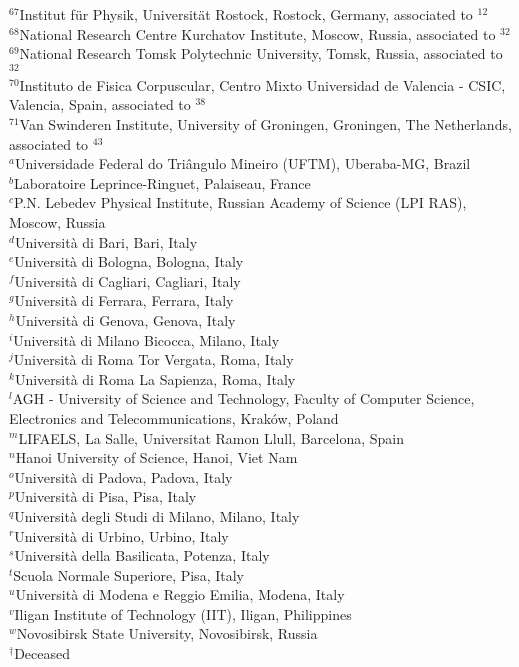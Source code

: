 \documentclass[12pt,a4paper]{article}
\begin{document}
\begin{flushleft}
{$ ^{67}$Institut f{\"u}r Physik, Universit{\"a}t Rostock, Rostock, Germany, associated to $^{12}$\\
$ ^{68}$National Research Centre Kurchatov Institute, Moscow, Russia, associated to $^{32}$\\
$ ^{69}$National Research Tomsk Polytechnic University, Tomsk, Russia, associated to $^{32}$\\
$ ^{70}$Instituto de Fisica Corpuscular, Centro Mixto Universidad de Valencia - CSIC, Valencia, Spain, associated to $^{38}$\\
$ ^{71}$Van Swinderen Institute, University of Groningen, Groningen, The Netherlands, associated to $^{43}$\\
\bigskip
$ ^{a}$Universidade Federal do Tri{\^a}ngulo Mineiro (UFTM), Uberaba-MG, Brazil\\
$ ^{b}$Laboratoire Leprince-Ringuet, Palaiseau, France\\
$ ^{c}$P.N. Lebedev Physical Institute, Russian Academy of Science (LPI RAS), Moscow, Russia\\
$ ^{d}$Universit{\`a} di Bari, Bari, Italy\\
$ ^{e}$Universit{\`a} di Bologna, Bologna, Italy\\
$ ^{f}$Universit{\`a} di Cagliari, Cagliari, Italy\\
$ ^{g}$Universit{\`a} di Ferrara, Ferrara, Italy\\
$ ^{h}$Universit{\`a} di Genova, Genova, Italy\\
$ ^{i}$Universit{\`a} di Milano Bicocca, Milano, Italy\\
$ ^{j}$Universit{\`a} di Roma Tor Vergata, Roma, Italy\\
$ ^{k}$Universit{\`a} di Roma La Sapienza, Roma, Italy\\
$ ^{l}$AGH - University of Science and Technology, Faculty of Computer Science, Electronics and Telecommunications, Krak{\'o}w, Poland\\
$ ^{m}$LIFAELS, La Salle, Universitat Ramon Llull, Barcelona, Spain\\
$ ^{n}$Hanoi University of Science, Hanoi, Viet Nam\\
$ ^{o}$Universit{\`a} di Padova, Padova, Italy\\
$ ^{p}$Universit{\`a} di Pisa, Pisa, Italy\\
$ ^{q}$Universit{\`a} degli Studi di Milano, Milano, Italy\\
$ ^{r}$Universit{\`a} di Urbino, Urbino, Italy\\
$ ^{s}$Universit{\`a} della Basilicata, Potenza, Italy\\
$ ^{t}$Scuola Normale Superiore, Pisa, Italy\\
$ ^{u}$Universit{\`a} di Modena e Reggio Emilia, Modena, Italy\\
$ ^{v}$Iligan Institute of Technology (IIT), Iligan, Philippines\\
$ ^{w}$Novosibirsk State University, Novosibirsk, Russia\\
\medskip
$ ^{\dagger}$Deceased
}
\end{flushleft} 
\end{document}
